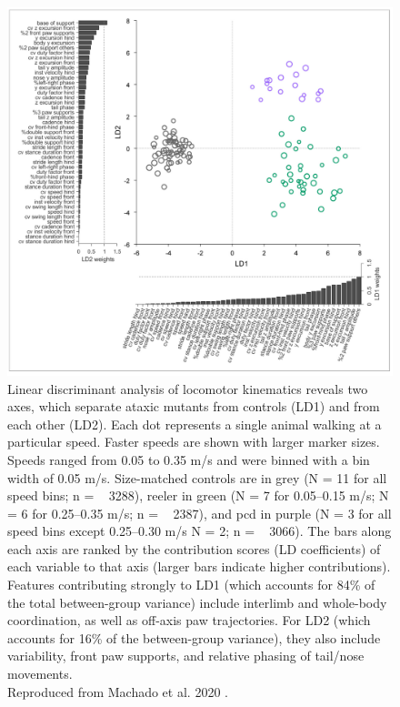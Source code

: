 \begin{figure}
    \centering
    \includegraphics[width=1\linewidth]{Chapters//Figures//chapter2/LDA.png}
    \caption{Linear discriminant analysis of locomotor kinematics reveals two axes, which separate ataxic mutants from controls (LD1) and from each other (LD2). Each dot represents a single animal walking at a particular speed. Faster speeds are shown with larger marker sizes. Speeds ranged from 0.05 to 0.35 m/s and were binned with a bin width of 0.05 m/s. Size-matched controls are in grey (N = 11 for all speed bins; n = ~ 3288), reeler in green (N = 7 for 0.05–0.15 m/s; N = 6 for 0.25–0.35 m/s; n = ~ 2387), and pcd in purple (N = 3 for all speed bins except 0.25–0.30 m/s N = 2; n = ~ 3066). The bars along each axis are ranked by the contribution scores (LD coefficients) of each variable to that axis (larger bars indicate higher contributions). Features contributing strongly to LD1 (which accounts for 84\% of the total between-group variance) include interlimb and whole-body coordination, as well as off-axis paw trajectories. For LD2 (which accounts for 16\% of the between-group variance), they also include variability, front paw supports, and relative phasing of tail/nose movements.\\ Reproduced from Machado et al. 2020 \cite{machado_shared_2020}.}
    \label{fig:LDA}
\end{figure}

